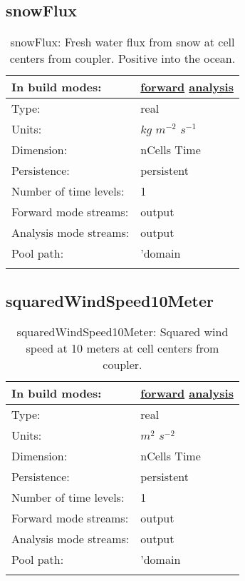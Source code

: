 \subsection[snowFlux]{snowFlux}
\label{subsec:var_sec_forcing_snowFlux}
\begin{center}
\begin{longtable}{| p{2.0in} | p{4.0in} |}
        \hline 
        In build modes: & \hyperref[subsec:forward_var_tab_forcing]{forward} \hyperref[subsec:analysis_var_tab_forcing]{analysis} \\
        \hline 
        Type: & real \\
        \hline 
        Units: & $kg$ $m^{-2}$ $s^{-1}$ \\
        \hline 
        Dimension: & nCells Time \\
        \hline 
        Persistence: & persistent \\
        \hline 
        Number of time levels: & 1 \\
        \hline 
		 Forward mode streams: &  output \\
        \hline 
		 Analysis mode streams: &  output \\
        \hline 
            Pool path: & 'domain %
 \\
		 \hline 
    \caption{snowFlux: Fresh water flux from snow at cell centers from coupler. Positive into the ocean.}
\end{longtable}
\end{center}
\subsection[squaredWindSpeed10Meter]{squaredWindSpeed10Meter}
\label{subsec:var_sec_forcing_squaredWindSpeed10Meter}
\begin{center}
\begin{longtable}{| p{2.0in} | p{4.0in} |}
        \hline 
        In build modes: & \hyperref[subsec:forward_var_tab_forcing]{forward} \hyperref[subsec:analysis_var_tab_forcing]{analysis} \\
        \hline 
        Type: & real \\
        \hline 
        Units: & $m^2$ $s^{-2}$ \\
        \hline 
        Dimension: & nCells Time \\
        \hline 
        Persistence: & persistent \\
        \hline 
        Number of time levels: & 1 \\
        \hline 
		 Forward mode streams: &  output \\
        \hline 
		 Analysis mode streams: &  output \\
        \hline 
            Pool path: & 'domain %
 \\
		 \hline 
    \caption{squaredWindSpeed10Meter: Squared wind speed at 10 meters at cell centers from coupler.}
\end{longtable}
\end{center}

